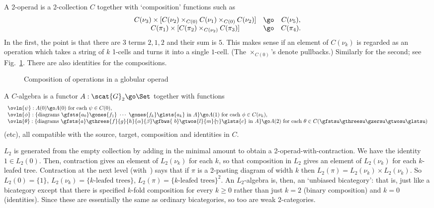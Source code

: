 A 2-operad is a 2-collection $C$ together with `composition' functions such as 
\[
\begin{array}{ccc}
C(\nu_3) \times [C(\nu_2) \times_{C(0)} C(\nu_1) \times_{C(0)} C(\nu_2)] 
&\go &
C(\nu_5), \\
C(\pi_1) \times [C(\pi_2) \times_{C(\nu_2)} C(\pi_3)] &\go & C(\pi_4).
\end{array}
\]
In the first, the point is that there are $3$ terms $2,1,2$ and their sum is
$5$.  This makes sense if an element of $C(\nu_k)$ is regarded as an
operation which takes a string of $k$ 1-cells and turns it into a single
$1$-cell.  (The $\times_{C(0)}$'s denote pullbacks.)  Similarly for the
second; see Fig.~\ref{fig:op-comp-l}.  There are also identities for the
compositions.
%
\begin{figure}
\caption{Composition of operations in a globular operad}
\label{fig:op-comp-l}
\end{figure}
%
A $C$-algebra is a functor $A: \scat{G}_2 \go \Set$ together with functions 
\[
\begin{array}{l}
\ovln{\psi}:	A(0) \go A(0) 
\textrm{ for each } \psi \in C(0),
\\
\ovln{\phi}: 	\{ \textrm{diagrams } \gfsts{a_0}\gones{f_1}\ \cdots \
\gones{f_k} \glsts{a_k} \textrm{ in } A \} \go A(1)			
\textrm{ for each } \phi \in C(\nu_k),
\\
\ovln{\theta}:	\{ \textrm{diagrams }
\gfsts{a}%
\gthrees{f}{g}{h}{\alpha}{\beta}%
\gfbws{\ b}\gtwos{l}{m}{\!\gamma}\glsts{c} 
\textrm{ in } A \} \go A(2)
\textrm{ for each } \theta \in C(\gfstsu\gthreesu\gzersu\gtwosu\glstsu)
\end{array}
\]
(etc), all compatible with the source, target, composition and identities in
$C$.

$L_2$ is generated from the empty collection by adding in the minimal amount
to obtain a 2-operad-with-contraction.  We have the identity $1\in L_2(0)$.
Then, contraction gives an element of $L_2(\nu_k)$ for each $k$, so that
composition in $L_2$ gives an element of $L_2(\nu_k)$ for each $k$-leafed
tree.  Contraction at the next level (with~\bref{eq:n-contr-l}) says that if
$\pi$ is a 2-pasting diagram of width $k$ then $L_2(\pi) = L_2(\nu_k) \times
L_2(\nu_k)$.  So $L_2(0) = \{1\}$, $L_2(\nu_k) = \{ k \textrm{-leafed trees}
\}$, $L_2(\pi) = \{ k \textrm{-leafed trees} \}^2$.  An $L_2$-algebra is,
then, an `unbiased bicategory': that is, just like a bicategory except that
there is specified $k$-fold composition for every $k\geq 0$ rather than just
$k=2$ (binary composition) and $k=0$ (identities).  Since these are
essentially the same as ordinary bicategories, so too are weak
$2$-categories.


